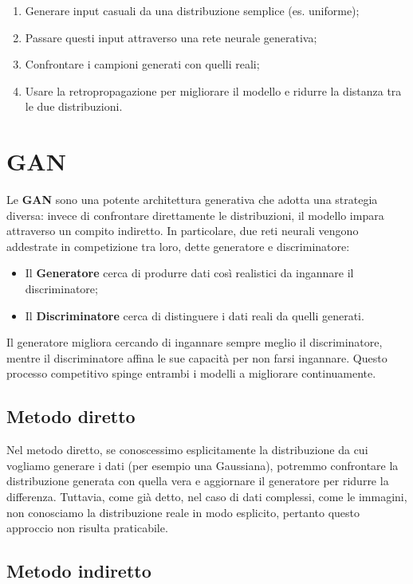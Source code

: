 \begin{enumerate}
    \item Generare input casuali da una distribuzione semplice (es. uniforme);
    \item Passare questi input attraverso una rete neurale generativa;
    \item Confrontare i campioni generati con quelli reali;
    \item Usare la retropropagazione per migliorare il modello e ridurre la distanza tra le due distribuzioni.
\end{enumerate}

\section{GAN}

Le \textbf{GAN} sono una potente architettura generativa che adotta una strategia diversa: invece di confrontare direttamente le distribuzioni, il modello impara attraverso un compito indiretto. In particolare, due reti neurali vengono addestrate in competizione tra loro, dette generatore e discriminatore:

\begin{itemize}
    \item Il \textbf{Generatore} cerca di produrre dati così realistici da ingannare il discriminatore;
    \item Il \textbf{Discriminatore} cerca di distinguere i dati reali da quelli generati.
\end{itemize}

Il generatore migliora cercando di ingannare sempre meglio il discriminatore, mentre il discriminatore affina le sue capacità per non farsi ingannare. Questo processo competitivo spinge entrambi i modelli a migliorare continuamente.

\subsection{Metodo diretto}

Nel metodo diretto, se conoscessimo esplicitamente la distribuzione da cui vogliamo generare i dati (per esempio una Gaussiana), potremmo confrontare la distribuzione generata con quella vera e aggiornare il generatore per ridurre la differenza. Tuttavia, come già detto, nel caso di dati complessi, come le immagini, non conosciamo la distribuzione reale in modo esplicito, pertanto questo approccio non risulta praticabile.

\subsection{Metodo indiretto}

